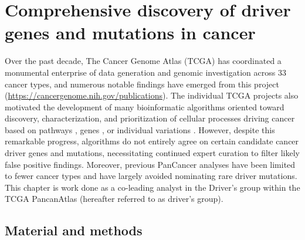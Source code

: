 
\chapter{Comprehensive discovery of driver genes and mutations in cancer}
\label{chap:ch7}

Over the past decade, The Cancer Genome Atlas (TCGA) has coordinated a monumental enterprise of data generation and genomic investigation across 33 cancer types, and numerous notable findings have emerged from this project (\url{https://cancergenome.nih.gov/publications}). The individual TCGA projects also motivated the development of many bioinformatic algorithms oriented toward discovery, characterization, and prioritization of cellular processes driving cancer based on pathways \cite{RN180}, genes \cite{RN49}, or individual variations \cite{RN181}. However, despite this remarkable progress, algorithms do not entirely agree on certain candidate cancer driver genes and mutations, necessitating continued expert curation to filter likely false positive findings. Moreover, previous PanCancer analyses \cite{RN96} have been limited to fewer cancer types and have largely avoided nominating rare driver mutations. This chapter is work done as a co-leading analyst in the Driver's group within the TCGA PancanAtlas (hereafter referred to as driver's group).

\section{Material and methods}

